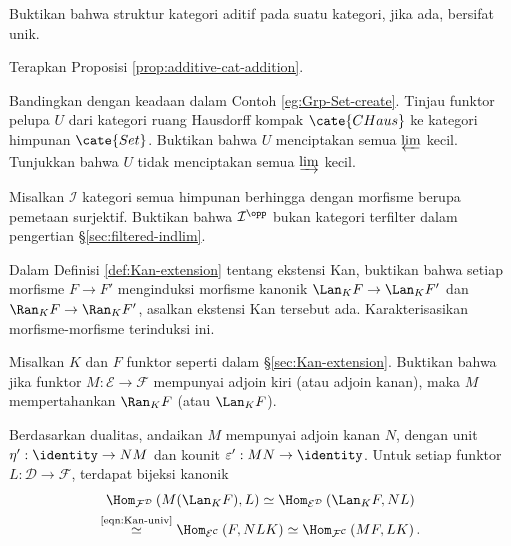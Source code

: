 \begin{Exercises}
	\item Buktikan bahwa struktur kategori aditif pada suatu kategori, jika
	ada, bersifat unik.
	\begin{hint}
		Terapkan Proposisi \ref{prop:additive-cat-addition}.
	\end{hint}

	\item Bandingkan dengan keadaan dalam Contoh \ref{eg:Grp-Set-create}.
	Tinjau funktor pelupa $U$ dari kategori ruang Hausdorff kompak
	$\cate{CHaus}$ ke kategori himpunan $\cate{Set}$. Buktikan bahwa $U$
	menciptakan semua $\varprojlim$ kecil. Tunjukkan bahwa $U$ tidak
	menciptakan semua $\varinjlim$ kecil.

	\item Misalkan $\mathcal{I}$ kategori semua himpunan berhingga dengan
	morfisme berupa pemetaan surjektif. Buktikan bahwa $\mathcal{I}^{\opp}$
	bukan kategori terfilter dalam pengertian \S\ref{sec:filtered-indlim}.

	\item Dalam Definisi \ref{def:Kan-extension} tentang ekstensi Kan,
	buktikan bahwa setiap morfisme $F\to F'$ menginduksi morfisme kanonik
	$\Lan_KF\to\Lan_KF'$ dan $\Ran_KF\to\Ran_KF'$, asalkan ekstensi Kan
	tersebut ada. Karakterisasikan morfisme-morfisme terinduksi ini.

	\item Misalkan $K$ dan $F$ funktor seperti dalam
	\S\ref{sec:Kan-extension}. Buktikan bahwa jika funktor
	$M:\mathcal{E}\to\mathcal{F}$ mempunyai adjoin kiri (atau adjoin kanan),
	maka $M$ mempertahankan $\Ran_KF$ (atau $\Lan_KF$).

	\begin{hint}
		Berdasarkan dualitas, andaikan $M$ mempunyai adjoin kanan $N$, dengan
		unit $\eta':\identity\to NM$ dan kounit
		$\varepsilon':MN\to\identity$. Untuk setiap funktor
		$L:\mathcal{D}\to\mathcal{F}$, terdapat bijeksi kanonik
		\begin{multline*}
			\Hom_{\mathcal{F}^{\mathcal{D}}} \left( M (\Lan_K F) , L \right) \simeq \Hom_{\mathcal{E}^{\mathcal{D}}} \left( \Lan_K F, N L \right) \\
			\stackrel{\text{\eqref{eqn:Kan-univ}}}{\simeq} \Hom_{\mathcal{E}^{\mathcal{C}}} \left( F, NLK \right) \simeq \Hom_{\mathcal{F}^{\mathcal{C}}} \left( MF, LK \right).
		\end{multline*}


\end{hint}
\end{Exercises}
